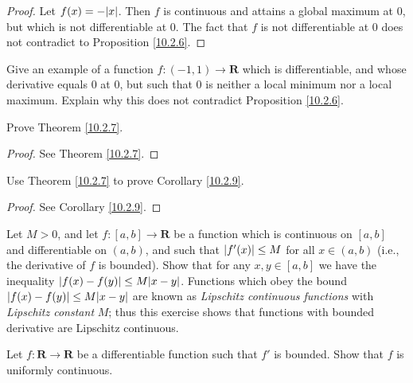 \begin{proof}
    Let \(f(x) = -\abs*{x}\).
    Then \(f\) is continuous and attains a global maximum at \(0\), but which is not differentiable at \(0\).
    The fact that \(f\) is not differentiable at \(0\) does not contradict to Proposition \ref{10.2.6}.
\end{proof}

\begin{exercise}\label{ex 10.2.3}
    Give an example of a function \(f : (-1, 1) \to \mathbf{R}\) which is differentiable, and whose derivative equals \(0\) at \(0\), but such that \(0\) is neither a local minimum nor a local maximum.
    Explain why this does not contradict Proposition \ref{10.2.6}.
\end{exercise}

\begin{exercise}\label{ex 10.2.4}
    Prove Theorem \ref{10.2.7}.
\end{exercise}

\begin{proof}
    See Theorem \ref{10.2.7}.
\end{proof}

\begin{exercise}\label{ex 10.2.5}
    Use Theorem \ref{10.2.7} to prove Corollary \ref{10.2.9}.
\end{exercise}

\begin{proof}
    See Corollary \ref{10.2.9}.
\end{proof}

\begin{exercise}\label{ex 10.2.6}
    Let \(M > 0\), and let \(f : [a, b] \to \mathbf{R}\) be a function which is continuous on \([a, b]\) and differentiable on \((a, b)\), and such that \(\abs*{f'(x)} \leq M\) for all \(x \in (a, b)\) (i.e., the derivative of \(f\) is bounded).
    Show that for any \(x, y \in [a, b]\) we have the inequality \(\abs*{f(x) - f(y)} \leq M \abs*{x - y}\).
    Functions which obey the bound \(\abs*{f(x) - f(y)} \leq M \abs*{x - y}\) are known as \emph{Lipschitz continuous functions} with \emph{Lipschitz constant} \(M\);
    thus this exercise shows that functions with bounded derivative are Lipschitz continuous.
\end{exercise}

\begin{exercise}\label{ex 10.2.7}
    Let \(f : \mathbf{R} \to \mathbf{R}\) be a differentiable function such that \(f'\) is bounded.
    Show that \(f\) is uniformly continuous.
\end{exercise}